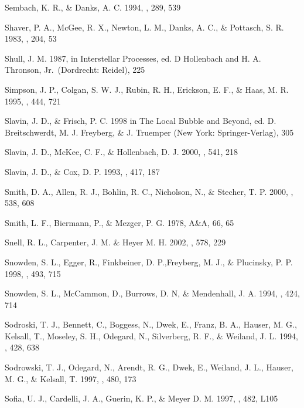 \documentclass[12pt,preprint,flushrt]{aastex}
\begin{document}
\begin{thebibliography}{}
Sembach, K. R., \& Danks, A. C. 1994,
\aap, 289, 539

Shaver, P. A., McGee, R. X., Newton,
L. M., Danks, A. C., \& Pottasch, S. R. 1983, \mnras, 204, 53

Shull, J. M. 1987, in Interstellar Processes,
ed. D Hollenbach and H. A. Thronson, Jr.\ (Dordrecht: Reidel), 225

Simpson, J. P., Colgan, S. W. J., Rubin,
R. H., Erickson, E. F., \& Haas, M. R. 1995, \apj, 444, 721

Slavin, J. D., \& Frisch, P. C.
1998 in The Local Bubble and Beyond, ed. D. Breitschwerdt, M. J. Freyberg,
\& J. Truemper (New York: Springer-Verlag), 305

Slavin, J. D., McKee,
C. F., \& Hollenbach, D. J. 2000, \apj, 541, 218

Slavin, J. D., \& Cox, D. P. 1993,
        \apj, 417, 187

Smith, D. A., Allen, R. J., Bohlin,
R. C., Nicholson, N., \& Stecher, T. P. 2000, \apj, 538, 608

Smith, L. F.,
Biermann, P., \& Mezger, P. G. 1978, A\&A, 66, 65

Snell, R. L., 
Carpenter, J. M. \& Heyer M. H. 2002, \apj, 578, 229

Snowden, S. L., Egger, R., Finkbeiner,
D. P.,Freyberg, M. J., \&  Plucinsky, P. P. 1998, \apj, 493, 715

Snowden, S. L., McCammon, D.,
Burrows, D. N, \& Mendenhall, J. A. 1994, \apj, 424, 714

Sodroski, T. J., Bennett, C., Boggess,
N., Dwek, E., Franz, B. A., Hauser, M. G., Kelsall, T., Moseley, S. H.,
Odegard, N., Silverberg, R. F., \& Weiland, J. L. 1994, \apj, 428, 638

Sodrowski, T. J., Odegard, N., Arendt, R. G., Dwek, E., Weiland,
J. L., Hauser, M. G., \& Kelsall, T. 1997, \apj, 480, 173

Sofia, U. J., Cardelli, J. A., Guerin,
K. P., \& Meyer D. M. 1997, \apj, 482, L105


\end{thebibliography}
\end{document}
